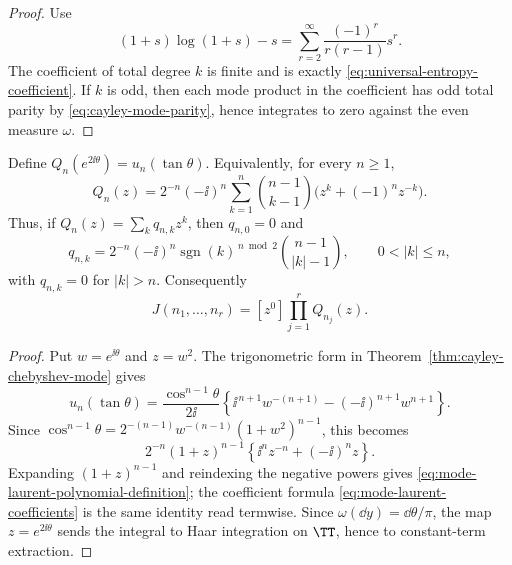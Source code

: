 \begin{proof}
Use
\[
(1+s)\log(1+s)-s=\sum_{r=2}^{\infty}\frac{(-1)^r}{r(r-1)}s^r.
\]
The coefficient of total degree \(k\) is finite and is exactly
\eqref{eq:universal-entropy-coefficient}.  If \(k\) is odd, then each mode
product in the coefficient has odd total parity by
\eqref{eq:cayley-mode-parity}, hence integrates to zero against the even
measure \(\omega\).
\end{proof}

\begin{theorem}%
\label{thm:finite-fourier-mode-integral-algorithm}
Define \(Q_n(e^{2\ii\theta})=u_n(\tan\theta)\).  Equivalently, for every
\(n\ge1\),
\begin{equation}\label{eq:mode-laurent-polynomial-definition}
Q_n(z)=2^{-n}(-\ii)^n
\sum_{k=1}^{n}\binom{n-1}{k-1}
\bigl(z^k+(-1)^nz^{-k}\bigr).
\end{equation}
Thus, if \(Q_n(z)=\sum_kq_{n,k}z^k\), then \(q_{n,0}=0\) and
\begin{equation}\label{eq:mode-laurent-coefficients}
q_{n,k}=
2^{-n}(-\ii)^n\operatorname{sgn}(k)^{\,n\bmod2}
\binom{n-1}{|k|-1},
\qquad 0<|k|\le n,
\end{equation}
with \(q_{n,k}=0\) for \(|k|>n\).
Consequently
\begin{equation}\label{eq:mode-integral-constant-term}
J(n_1,\ldots,n_r)=[z^0]\prod_{j=1}^r Q_{n_j}(z).
\end{equation}
\end{theorem}

\begin{proof}
Put \(w=e^{\ii\theta}\) and \(z=w^2\).  The trigonometric form in
Theorem~\ref{thm:cayley-chebyshev-mode} gives
\[
u_n(\tan\theta)
=\frac{\cos^{n-1}\theta}{2\ii}
\left\{\ii^{\,n+1}w^{-(n+1)}
-(-\ii)^{n+1}w^{n+1}\right\}.
\]
Since
\(\cos^{n-1}\theta=2^{-(n-1)}w^{-(n-1)}(1+w^2)^{n-1}\), this becomes
\[
2^{-n}(1+z)^{n-1}
\left\{\ii^nz^{-n}+(-\ii)^nz\right\}.
\]
Expanding \((1+z)^{n-1}\) and reindexing the negative powers gives
\eqref{eq:mode-laurent-polynomial-definition}; the coefficient formula
\eqref{eq:mode-laurent-coefficients} is the same identity read termwise.
Since \(\omega(\dd y)=\dd\theta/\pi\), the map \(z=e^{2\ii\theta}\) sends
the integral to Haar integration on \(\TT\), hence to constant-term
extraction.
\end{proof}


